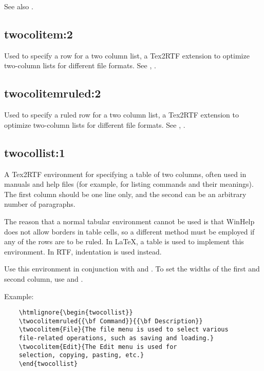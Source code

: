 See also .

\subsection*{twocolitem:2}\label{twocolitem}

Used to specify a row for a two column list, a Tex2RTF
extension to optimize two-column lists for different
file formats.  See ,
\rtfsp{}.

\subsection*{twocolitemruled:2}\label{twocolitemruled}

Used to specify a ruled row for a two column list, a Tex2RTF
extension to optimize two-column lists for different
file formats.  See ,
\rtfsp{}.

\subsection*{twocollist:1}\label{twocollist}

A Tex2RTF environment for specifying a table of two columns, often
used in manuals and help files (for example, for listing commands and
their meanings). The first column should be one line only, and
the second can be an arbitrary number of paragraphs.

The reason that a normal tabular environment cannot be used is that
WinHelp does not allow borders in table cells, so a different method
must be employed if any of the rows are to be ruled. In \LaTeX, a table
is used to implement this environment. In RTF, indentation is used instead.

Use this environment in conjunction with  and\rtfsp
{}. To set the widths of the first
and second column, use  and\rtfsp
{}.

Example:

\begin{verbatim}
    \htmlignore{\begin{twocollist}}
    \twocolitemruled{{\bf Command}}{{\bf Description}}
    \twocolitem{File}{The file menu is used to select various
    file-related operations, such as saving and loading.}
    \twocolitem{Edit}{The Edit menu is used for
    selection, copying, pasting, etc.}
    \end{twocollist}
\end{verbatim}

